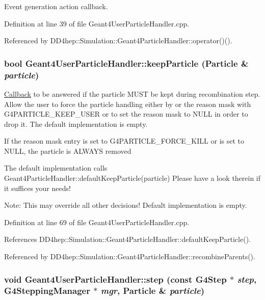 Event generation action callback. 

Definition at line 39 of file Geant4UserParticleHandler.cpp.

Referenced by DD4hep::Simulation::Geant4ParticleHandler::operator()().\hypertarget{class_d_d4hep_1_1_simulation_1_1_geant4_user_particle_handler_a34cc6206492754adfea2f007313512dc}{
\subsubsection[{keepParticle}]{\setlength{\rightskip}{0pt plus 5cm}bool Geant4UserParticleHandler::keepParticle ({\bf Particle} \& {\em particle})}}
\label{class_d_d4hep_1_1_simulation_1_1_geant4_user_particle_handler_a34cc6206492754adfea2f007313512dc}


\hyperlink{class_d_d4hep_1_1_callback}{Callback} to be answered if the particle MUST be kept during recombination step. Allow the user to force the particle handling either by or the reason mask with G4PARTICLE\_\-KEEP\_\-USER or to set the reason mask to NULL in order to drop it. The default implementation is empty.

If the reason mask entry is set to G4PARTICLE\_\-FORCE\_\-KILL or is set to NULL, the particle is ALWAYS removed

The default implementation calls Geant4ParticleHandler::defaultKeepParticle(particle) Please have a look therein if it suffices your needs!

Note: This may override all other decisions! Default implementation is empty. 

Definition at line 69 of file Geant4UserParticleHandler.cpp.

References DD4hep::Simulation::Geant4ParticleHandler::defaultKeepParticle().

Referenced by DD4hep::Simulation::Geant4ParticleHandler::recombineParents().\hypertarget{class_d_d4hep_1_1_simulation_1_1_geant4_user_particle_handler_ac6a981e18ee2fa776907fda60aa54bb6}{
\subsubsection[{step}]{\setlength{\rightskip}{0pt plus 5cm}void Geant4UserParticleHandler::step (const G4Step $\ast$ {\em step}, \/  G4SteppingManager $\ast$ {\em mgr}, \/  {\bf Particle} \& {\em particle})}}
\label{class_d_d4hep_1_1_simulation_1_1_geant4_user_particle_handler_ac6a981e18ee2fa776907fda60aa54bb6}


